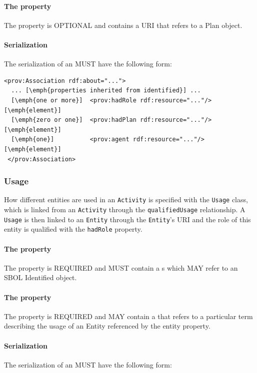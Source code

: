 \paragraph{The  property}\label{sec:hadPlan}
The  property is OPTIONAL and contains a URI that refers to a Plan object.

\paragraph{Serialization}
The serialization of an  MUST have the following form:


\begin{lstlisting}
<prov:Association rdf:about="...">
  ... [\emph{properties inherited from identified}] ...
  [\emph{one or more}]  <prov:hadRole rdf:resource="..."/> [\emph{element}]
  [\emph{zero or one}]  <prov:hadPlan rdf:resource="..."/> [\emph{element}]
  [\emph{one}]          <prov:agent rdf:resource="..."/> [\emph{element}]
 </prov:Association>
\end{lstlisting}

\subsubsection{Usage}
\label{sec:Usage}
How different entities are used in an \texttt{Activity} is specified with the \texttt{Usage} class, which is linked from an \texttt{Activity} through the \texttt{qualifiedUsage} relationship. A \texttt{Usage} is then linked to an \texttt{Entity} through the \texttt{Entity}'s URI and the role of this entity is qualified with the \texttt{hadRole} property. 


\paragraph{The  property}\label{sec:entity}
The  property is REQUIRED and MUST contain a s which MAY refer to an SBOL Identified object.

\paragraph{The  property}\label{sec:hadRole:usage}
The  property is REQUIRED and MAY contain a  that refers to a particular term describing the usage of an Entity referenced by the entity property.


\paragraph{Serialization}
The serialization of an  MUST have the following form:

